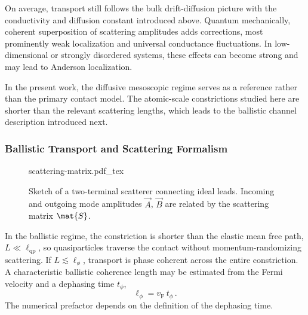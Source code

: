             On average, transport still follows the bulk drift-diffusion picture with the conductivity and diffusion constant introduced above. Quantum mechanically, coherent superposition of scattering amplitudes adds corrections, most prominently weak localization and universal conductance fluctuations. In low-dimensional or strongly disordered systems, these effects can become strong and may lead to Anderson localization. \cite{bergmann_weak_1984,lee_universal_1985,lee_disordered_1985,anderson_absence_1958,schertel_magnetic-field_2019}

            In the present work, the diffusive mesoscopic regime serves as a reference rather than the primary contact model. The atomic-scale constrictions studied here are shorter than the relevant scattering lengths, which leads to the ballistic channel description introduced next.

        \subsubsection*{Ballistic Transport and Scattering Formalism}

            \begin{figure}
                \captionsetup{format=plain}%
                \centering
                \vspace{-1em} %
                {scattering-matrix.pdf_tex}
                \vspace{-.25em} %
                \caption{
                    Sketch of a two-terminal scatterer connecting ideal leads. Incoming and outgoing mode amplitudes $\vec{A}$, $\vec{B}$ are related by the scattering matrix $\mat{S}$.
                }
                \label{fig:quasi:scatter}
            \end{figure}
            In the ballistic regime, the constriction is shorter than the elastic mean free path, $L \ll \ell_\mathrm{qp}$, so quasiparticles traverse the contact without momentum-randomizing scattering. If $L \lesssim \ell_\phi$, transport is phase coherent across the entire constriction. A characteristic ballistic coherence length may be estimated from the Fermi velocity and a dephasing time $t_\phi$,
            \begin{equation}
                \ell_\phi = v_\mathrm{F} \, t_\phi\,.
            \end{equation}
            The numerical prefactor depends on the definition of the dephasing time.

